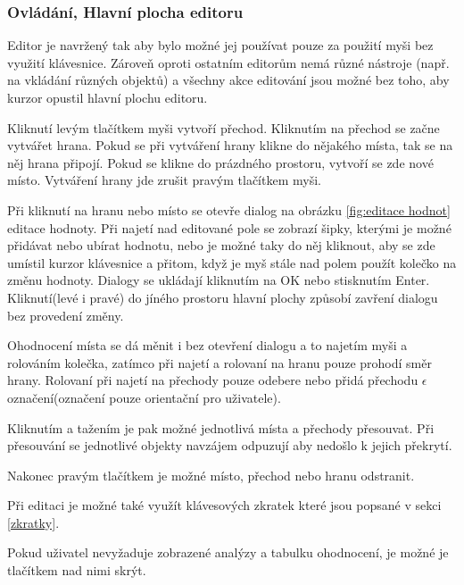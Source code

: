 \documentclass[
  biblatex,
  glossaries,
]{kidiplom}
\begin{document}
\subsubsection{Ovládání, Hlavní plocha editoru}\label{hlavní plocha}

Editor je navržený tak aby bylo možné jej používat pouze za použití 
myši bez využití klávesnice. Zároveň oproti ostatním editorům
nemá různé nástroje (např. na vkládání různých objektů) a všechny 
akce editování jsou možné bez toho, aby kurzor opustil hlavní plochu editoru.

Kliknutí levým tlačítkem myši vytvoří přechod. 
Kliknutím na přechod se začne vytvářet hrana. Pokud se při 
vytváření hrany klikne do nějakého místa, tak se na něj hrana 
připojí. Pokud se klikne do prázdného prostoru, vytvoří se zde nové místo.
Vytváření hrany jde zrušit pravým tlačítkem myši.

Při kliknutí na hranu nebo místo se otevře dialog 
na obrázku \ref{fig:editace hodnot} editace hodnoty.
Při najetí nad editované pole se zobrazí šipky, kterými 
je možné přidávat nebo ubírat hodnotu, nebo je možné taky 
do něj kliknout, aby se zde umístil kurzor klávesnice a 
přitom, když je myš stále nad polem použít kolečko na změnu hodnoty.
Dialogy se ukládají kliknutím na OK nebo stisknutím Enter. 
Kliknutí(levé i pravé) do jíného prostoru
hlavní plochy způsobí zavření dialogu bez provedení změny.

Ohodnocení místa se dá měnit i bez otevření dialogu a to najetím myši
a rolováním kolečka, zatímco při najetí a rolovaní na hranu pouze prohodí směr
hrany. Rolovaní při najetí na přechody pouze odebere nebo přidá přechodu 
$\epsilon$ označení(označení pouze orientační pro uživatele).

Kliknutím a tažením je pak možné jednotlivá místa a přechody přesouvat.
Při přesouvání se jednotlivé objekty navzájem odpuzují aby nedošlo k jejich překrytí.

Nakonec pravým tlačítkem je možné místo, přechod nebo hranu odstranit.

Při editaci je možné také využít klávesových zkratek které jsou popsané v sekci \ref{zkratky}.

Pokud uživatel nevyžaduje zobrazené analýzy a tabulku ohodnocení, je možné je tlačítkem nad nimi skrýt.
\end{document}

